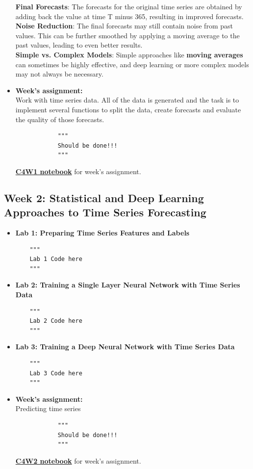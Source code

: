 \documentclass[20pt]{article}
\newcommand{\speciallink}[2]{\textbf{\textcolor{red}{\href{#1}{#2}}}}
\begin{document}
\begin{itemize}
		\textbf{Final Forecasts}: The forecasts for the original time series are obtained by adding back the value at time T minus 365, resulting in improved forecasts.\\
		\textbf{Noise Reduction}: The final forecasts may still contain noise from past values. This can be further smoothed by applying a moving average to the past values, leading to even better results.\\
		\textbf{Simple vs. Complex Models}: Simple approaches like \textbf{moving averages} can sometimes be highly effective, and deep learning or more complex models may not always be necessary.
		\item \textbf{Week's assignment:}\\
		Work with time series data. All of the data is generated and the task is to implement several functions to split the data, create forecasts and evaluate the quality of those forecasts.
		\begin{verbatim}
			"""
			Should be done!!!
			"""
		\end{verbatim}
		\speciallink{https://drive.google.com/file/d/1wYCVYszbeBfWRB6kX9NINBWFseD8nd59/view?usp=drive\_link}{C4W1 notebook} for week's assignment.		
	\end{itemize}
	\subsection{Week 2: Statistical and Deep Learning Approaches to Time Series Forecasting}
	\begin{itemize}
		\item \textbf{Lab 1: Preparing Time Series Features and Labels}
		\begin{verbatim}
	"""
	Lab 1 Code here
	"""
		\end{verbatim}
		\item \textbf{Lab 2: Training a Single Layer Neural Network with Time Series Data}
		\begin{verbatim}
	"""
	Lab 2 Code here
	"""
		\end{verbatim}
		\item \textbf{Lab 3: Training a Deep Neural Network with Time Series Data}
		\begin{verbatim}
	"""
	Lab 3 Code here
	"""
		\end{verbatim}
		\item \textbf{Week's assignment:}\\
		Predicting time series
		\begin{verbatim}
			"""
			Should be done!!!
			"""
		\end{verbatim}
		\speciallink{https://drive.google.com/file/d/18-VdKy39XDuRYdZipjfkXdUX1iXD2Kd8/view?usp=drive\_link}{C4W2 notebook} for week's assignment.
	\end{itemize}
\end{document}
